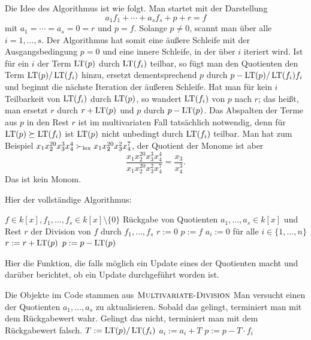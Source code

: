 \documentclass[11pt]{article}
\numberwithin{equation}{section}
\begin{document}
Die Idee des Algorithmus ist wie folgt. Man startet mit  der Darstellung 
\[
a_1 f_1 + \cdots + a_s f_s + p + r = f
\]
mit $a_1 = \cdots = a_s =0 = r$ und $p=f$. Solange $p \ne 0$,  scannt man über alle $i=1,\ldots, s$. Der Algorithmus hat somit eine äußere Schleife mit der Ausgangsbedingung $p=0$ und eine innere Schleife, in der über $i$ iteriert wird. Ist für ein $i$  der Term $\operatorname{LT}(p)$ durch $\operatorname{LT}(f_i)$ teilbar, so fügt man den Quotienten den Term $\operatorname{LT}(p) / \operatorname{LT}(f_i)$ hinzu, ersetzt dementsprechend $p$ durch $p - \operatorname{LT}(p) / \operatorname{LT}(f_i) f_i$ und beginnt die nächste Iteration der äußeren Schleife.  Hat man für kein $i$  Teilbarkeit von $\operatorname{LT}(f_i)$ durch $\operatorname{LT}(p)$, so wandert $\operatorname{LT}(f_i)$ von $p$ nach $r$; das heißt, man ersetzt $r$ durch $r + \operatorname{LT}(p)$ und $p$ durch $p - \operatorname{LT}(p)$. 
Das Abspalten der Terme aus $p$ in den Rest $r$ ist im multivariaten Fall tatsächlich notwendig, denn für $\operatorname{LT}(p) \succeq \operatorname{LT}(f_i)$  ist $\operatorname{LT}(p)$ nicht unbedingt durch $\operatorname{LT}(f_i)$ teilbar. Man hat zum Beispiel $x_1 x_2^{20} x_3^3 x_4^4 \succ_{\operatorname{lex}} x_1 x_2^{20} x_3^2 x_4^7 $, der Quotient der Monome ist aber 
\[
	\frac{x_1 x_2^{20} x_3^3 x_4^4}{x_1 x_2^{20} x_3^2 x_4^7}  = \frac{x_3}{x_4^3}.
\]
Das ist kein Monom. 

Hier der vollständige Algorithmus: 

\begin{algorithm}[H]
	\caption{$\cc{Multivariate-Division}(f,f_1,\ldots,f_s)$}
	\begin{algorithmic}[1]
		\REQUIRE $f \in k[x], f_1,\ldots,f_s \in k[x] \setminus \{0\}$
		\ENSURE Rückgabe von Quotienten $a_1,\ldots,a_s \in k[x]$ und Rest $r$ der Division von $f$ durch $f_1,\ldots,f_s$ 
		\STATE $r:=0$ 
		\STATE $p:=f$ 
		\STATE $a_i :=0$ für alle $i \in \{1,\ldots,n\}$  
		\STATE{}
			\STATE $r := r + \operatorname{LT}(p)$
			\STATE $p:= p - \operatorname{LT}(p)$  
		\ENDIF 
		\ENDWHILE 
	\end{algorithmic}
\end{algorithm}

Hier die Funktion, die falls möglich ein Update eines der Quotienten macht und darüber berichtet, ob ein Update durchgeführt worden ist. 

\begin{algorithm}[H]
	\caption{$\cc{Quotients-Updated}()$}
	\begin{algorithmic}[1]
			\REQUIRE Die Objekte im Code stammen aus $\mathop{\text{\textsc{Multivariate-Division}}}$
				\ENSURE Man versucht einen der Quotienten $a_1,\ldots,a_s$ zu aktualisieren. Sobald das gelingt, terminiert man mit dem Rückgabewert wahr. Gelingt das nicht, terminiert man mit dem Rückgabewert falsch. 
						\STATE $T:= \operatorname{LT}(p) / \operatorname{LT}(f_i)$ 
						\STATE $a_i := a_i +T$
						\STATE $p := p - T \cdot f_i$ 
				\ENDIF 
			\ENDFOR 
	\end{algorithmic} 
\end{algorithm} 
\end{document}
